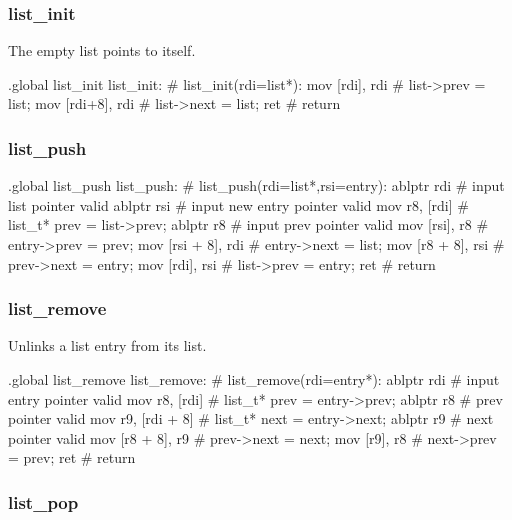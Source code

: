 \subsubsection{list\_init}

The empty list points to itself.

\begin{asm}
.global list_init
list_init:				    # list_init(rdi=list*):
	mov	[rdi], rdi		    #   list->prev = list;
	mov	[rdi+8], rdi		    #   list->next = list;
	ret				    #   return
\end{asm}

\subsubsection{list\_push}

\begin{asm}
.global list_push
list_push:				    # list_push(rdi=list*,rsi=entry):
	ablptr	rdi                         #   input list pointer valid
	ablptr	rsi                         #   input new entry pointer valid
	mov	r8, [rdi]		    #   list_t* prev = list->prev;
	ablptr	r8                          #   input prev pointer valid
	mov	[rsi], r8		    #   entry->prev = prev;
	mov	[rsi + 8], rdi		    #   entry->next = list;
	mov	[r8 + 8], rsi		    #   prev->next = entry;
	mov	[rdi], rsi		    #   list->prev = entry;
	ret				    #   return
\end{asm}

\subsubsection{list\_remove}

Unlinks a list entry from its list.

\begin{asm}
.global list_remove
list_remove:				    # list_remove(rdi=entry*):
	ablptr	rdi                         #   input entry pointer valid
	mov	r8, [rdi]		    #   list_t* prev = entry->prev;
	ablptr	r8                          #   prev pointer valid
	mov	r9, [rdi + 8]		    #   list_t* next = entry->next;
	ablptr	r9                          #   next pointer valid
	mov	[r8 + 8], r9		    #   prev->next = next;
	mov	[r9], r8		    #   next->prev = prev;
	ret				    #   return
\end{asm}

\subsubsection{list\_pop}

